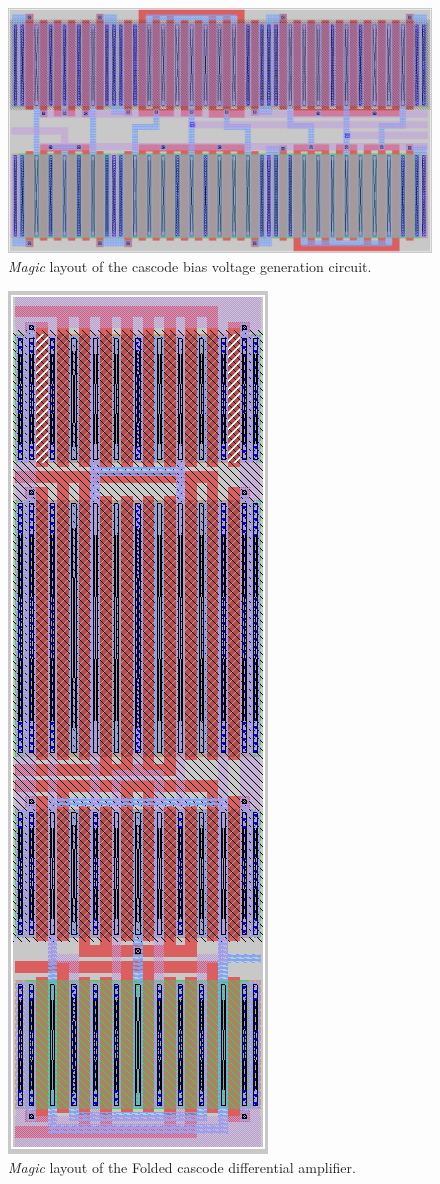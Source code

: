 \documentclass[11pt]{article}
\begin{document}
    \begin{figure}[!ht]
        \centering
        \includegraphics[width=0.99\linewidth]{../img/bias_mag.png}
        \caption{\textit{Magic} layout of the cascode bias voltage generation circuit.}
        \label{fig:biasmag}
    \end{figure}
    \begin{figure}[!ht]
        \centering
        \includegraphics[width=0.4\linewidth]{../img/cas_mag.png}
        \caption{\textit{Magic} layout of the Folded cascode differential amplifier.}
        \label{fig:casmag}
    \end{figure}
\end{document}
